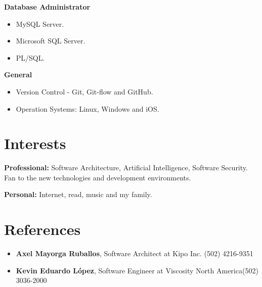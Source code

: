 \documentclass[]{friggeri-cv} %
\begin{document}
\textbf{Database Administrator}
\begin{itemize}
	\item MySQL Server.
	\item Microsoft SQL Server.
	\item PL/SQL.
\end{itemize}

\textbf{General}
\begin{itemize}
	\item Version Control - Git, Git-flow and GitHub.
	\item Operation Systems: Linux, Windows and iOS.
\end{itemize}






\section{Interests}

\textbf{Professional:} Software Architecture, Artificial Intelligence, Software Security. Fan to the new technologies and development environments. 

\textbf{Personal:} Internet, read, music and my family.

\section{References}

\begin{itemize}
	\item \noindent \textbf{Axel Mayorga Ruballos},  Software Architect at Kipo Inc. \hfill \hfill (502) 4216-9351
	\item \noindent \textbf{Kevin Eduardo López}, Software Engineer at Viscosity North America\hfill \hfill (502) 3036-2000
\end{itemize}
\end{document}
